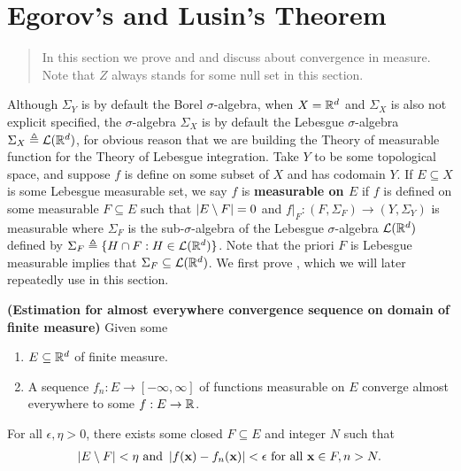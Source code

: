 \documentclass{report}
\begin{document}
\section{Egorov's and Lusin's Theorem}
\begin{abstract}
In this section we prove  and  and discuss about convergence in measure. Note that $Z$ always stands for some null set in this section.
\end{abstract}
\begin{mdframed}
Although $\Sigma_Y$ is by default the Borel $\sigma$-algebra, when $X=\mathbb{R}^d$ and  $\Sigma_X$ is also not explicit specified, the $\sigma$-algebra $\Sigma_X$ is by default the Lebesgue $\sigma$-algebra $\Sigma_X\triangleq \mathcal{L}(\mathbb{R}^d)$, for obvious reason that we are building the Theory of measurable function for the Theory of Lebesgue integration. Take $Y$ to be some topological space, and suppose $f$ is define on some subset of $X$ and has codomain $Y$. If  $E\subseteq X$ is some Lebesgue measurable set, we say  $f$ is \textbf{measurable on $E$} if $f$ is defined on some measurable $F\subseteq E$ such that $\left|E \setminus F\right|=0$ and $f|_F:(F,\Sigma_F)\rightarrow (Y,\Sigma_Y)$ is measurable where $\Sigma_F$ is the sub-$\sigma$-algebra of the Lebesgue $\sigma$-algebra $\mathcal{L}(\mathbb{R}^d)$ defined by $\Sigma_F \triangleq \{ H\cap F:H \in \mathcal{L}(\mathbb{R}^d) \}$. Note that the priori $F$ is Lebesgue measurable implies that $\Sigma_F\subseteq \mathcal{L}(\mathbb{R}^d)$. We first prove , which we will later repeatedly use in this section. 
\end{mdframed}
\begin{theorem}
\label{Docae}
\textbf{(Estimation for almost everywhere convergence sequence on domain of finite measure)} Given some
\begin{enumerate}[label=(\alph*)]
  \item $E\subseteq \mathbb{R}^d$ of finite measure.  
  \item A sequence $f_n:E\rightarrow [-\infty,\infty]$ of functions measurable on $E$ converge almost everywhere to some $f:E\rightarrow \mathbb{R}$. 
\end{enumerate}
For all $\epsilon ,\eta>0 $, there exists some closed $F\subseteq E$ and integer $N$ such that
\begin{align*}
  \left|E\setminus F\right|<\eta\text{  and } \left|f(\textbf{x})-f_n(\textbf{x})\right|<\epsilon \text{ for all }\textbf{x} \in F,n>N.  
\end{align*}
\end{theorem}
\end{document}

